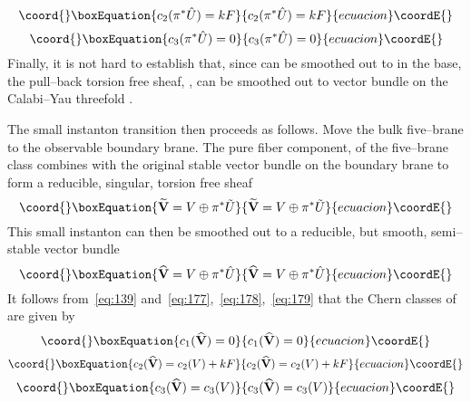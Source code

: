 \documentclass[a4paper,12pt]{article}
\numberwithin{equation}{section}
\providecommand{\bV}{{\mathbf V}}
\theoremstyle{plain}
\begin{document}
\begin{equation}\coord{}\boxEquation{
c_{2}(\pi^{*}\hat{U})=kF
\label{eq:178}
}{
c_{2}(\pi^{*}\hat{U})=kF
}{ecuacion}\coordE{}\end{equation}
\begin{equation}\coord{}\boxEquation{
c_{3}(\pi^{*}\hat{U})=0
\label{eq:179}
}{
c_{3}(\pi^{*}\hat{U})=0
}{ecuacion}\coordE{}\end{equation}
Finally, it is not hard to establish that, since \coordHE{} can be smoothed
out to \coordHE{} in the base, the pull--back torsion free
sheaf, \coordHE{}, can be smoothed out to vector bundle
\coordHE{} on the Calabi--Yau threefold \coordHE{}.

The small instanton transition then proceeds as follows. Move the bulk
five--brane to the observable boundary brane. The pure fiber component,
\coordHE{} of the five--brane class combines with the original stable
vector bundle \coordHE{} on the boundary brane to form a reducible, singular, torsion
free sheaf 
\begin{equation}\coord{}\boxEquation{
\widetilde{\bV}= V \oplus \pi^{*}\tilde{U}
\label{eq:180}
}{
\widetilde{\bV}= V \oplus \pi^{*}\tilde{U}
}{ecuacion}\coordE{}\end{equation}
This small instanton can then be smoothed out to a reducible, but smooth,
semi--stable \coordHE{} vector bundle 
\begin{equation}\coord{}\boxEquation{
\widehat{\bV}= V \oplus \pi^{*}\hat{U}
\label{eq:181}
}{
\widehat{\bV}= V \oplus \pi^{*}\hat{U}
}{ecuacion}\coordE{}\end{equation}
It follows from~\eqref{eq:139}
and~\eqref{eq:177},~\eqref{eq:178},~\eqref{eq:179} that the Chern classes of
\myHighlight{$\widehat{\bV}$}\coordHE{} are given by
\begin{equation}\coord{}\boxEquation{
c_{1}(\widehat{\bV})=0
\label{eq:182}
}{
c_{1}(\widehat{\bV})=0
}{ecuacion}\coordE{}\end{equation}
\begin{equation}\coord{}\boxEquation{
c_{2}(\widehat{\bV})=c_{2}(V)+kF
\label{eq:183}
}{
c_{2}(\widehat{\bV})=c_{2}(V)+kF
}{ecuacion}\coordE{}\end{equation}
\begin{equation}\coord{}\boxEquation{
c_{3}(\widehat{\bV})=c_{3}(V)
\label{eq:184}
}{
c_{3}(\widehat{\bV})=c_{3}(V)
}{ecuacion}\coordE{}\end{equation}
\end{document}
